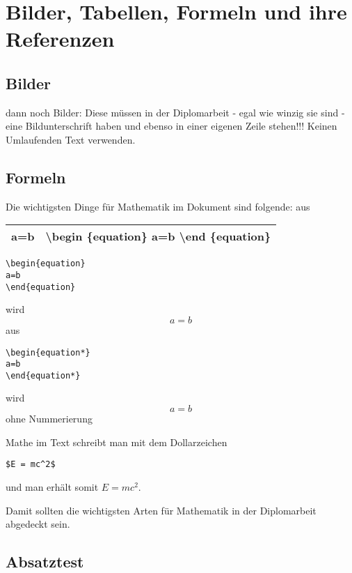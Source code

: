 \chapter{Bilder, Tabellen, Formeln und ihre Referenzen}
\section{Bilder}
dann noch Bilder:
Diese müssen in der Diplomarbeit - egal wie winzig sie sind - eine Bildunterschrift haben und ebenso in einer eigenen Zeile stehen!!! Keinen Umlaufenden Text verwenden.
\section{Formeln}
Die wichtigsten Dinge für Mathematik im Dokument sind folgende:
aus\\
\begin{tabular}[h]{cc}
\hline 
 a=b  & \textbackslash begin \{equation\} a=b \textbackslash end \{equation\} \\ 
\hline 
\end{tabular} 

\begin{lstlisting}
\begin{equation}
a=b
\end{equation}
\end{lstlisting} 
wird
\begin{equation}
a=b
\end{equation}
aus 
\begin{lstlisting}
\begin{equation*}
a=b
\end{equation*}
\end{lstlisting}
wird
\begin{equation*}
a=b
\end{equation*}
ohne Nummerierung

Mathe im Text schreibt man mit dem Dollarzeichen
\begin{lstlisting}
$E = mc^2$
\end{lstlisting}
und man erhält somit $E=mc^2$.

Damit sollten die wichtigsten Arten für Mathematik in der Diplomarbeit abgedeckt sein.





\section{Absatztest}

